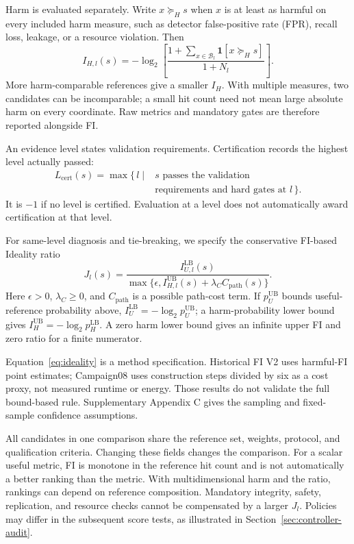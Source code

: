 \documentclass[manuscript,screen,nonacm]{acmart}
\begin{document}
Harm is evaluated separately. Write $x\succeq_H s$ when $x$ is at least
as harmful on every included harm measure, such as detector false-positive
rate (FPR), recall loss, leakage, or a resource violation. Then
\begin{equation}
I_{H,l}(s)=-\log_2\!\left[
\frac{1+\sum_{x\in\mathcal{B}_l}\mathbf{1}[x\succeq_H s]}{1+N_l}
\right].
\label{eq:harmfi}
\end{equation}
More harm-comparable references give a smaller $I_H$. With multiple measures,
two candidates can be incomparable; a small hit count need not mean large
absolute harm on every coordinate. Raw metrics and mandatory gates are
therefore reported alongside FI.

An evidence level states validation requirements. Certification records
the highest level actually passed:
\begin{equation}
\begin{aligned}
L_{\mathrm{cert}}(s)=\max\{\,l\mid&s\text{ passes the validation}\\
&\text{requirements and hard gates at }l\,\}.
\end{aligned}
\label{eq:certlevel}
\end{equation}
It is $-1$ if no level is certified. Evaluation at a level does not
automatically award certification at that level.

For same-level diagnosis and tie-breaking, we specify the conservative
FI-based Ideality ratio
\begin{equation}
J_l(s)=
\frac{I_{U,l}^{\mathrm{LB}}(s)}
{\max\{\epsilon,I_{H,l}^{\mathrm{UB}}(s)+\lambda_C C_{\mathrm{path}}(s)\}}.
\label{eq:ideality}
\end{equation}
Here $\epsilon>0$, $\lambda_C\geq0$, and $C_{\mathrm{path}}$ is a possible
path-cost term. If $p_U^{\mathrm{UB}}$ bounds useful-reference probability
above, $I_U^{\mathrm{LB}}=-\log_2p_U^{\mathrm{UB}}$; a harm-probability
lower bound gives $I_H^{\mathrm{UB}}=-\log_2p_H^{\mathrm{LB}}$.
A zero harm lower bound gives an infinite upper FI and zero ratio for a
finite numerator.

Equation~\ref{eq:ideality} is a method specification. Historical FI V2
uses harmful-FI point estimates; Campaign08 uses construction steps divided
by six as a cost proxy, not measured runtime or energy. Those results do
not validate the full bound-based rule. Supplementary Appendix C gives
the sampling and fixed-sample confidence assumptions.

All candidates in one comparison share the reference set, weights,
protocol, and qualification criteria. Changing these fields changes the
comparison. For a scalar useful metric, FI is monotone in the reference
hit count and is not automatically a better ranking than the metric.
With multidimensional harm and the ratio, rankings can depend on reference
composition. Mandatory integrity, safety, replication, and resource checks
cannot be compensated by a larger $J_l$. Policies may differ in the
subsequent score tests, as illustrated in Section~\ref{sec:controller-audit}.
\end{document}
